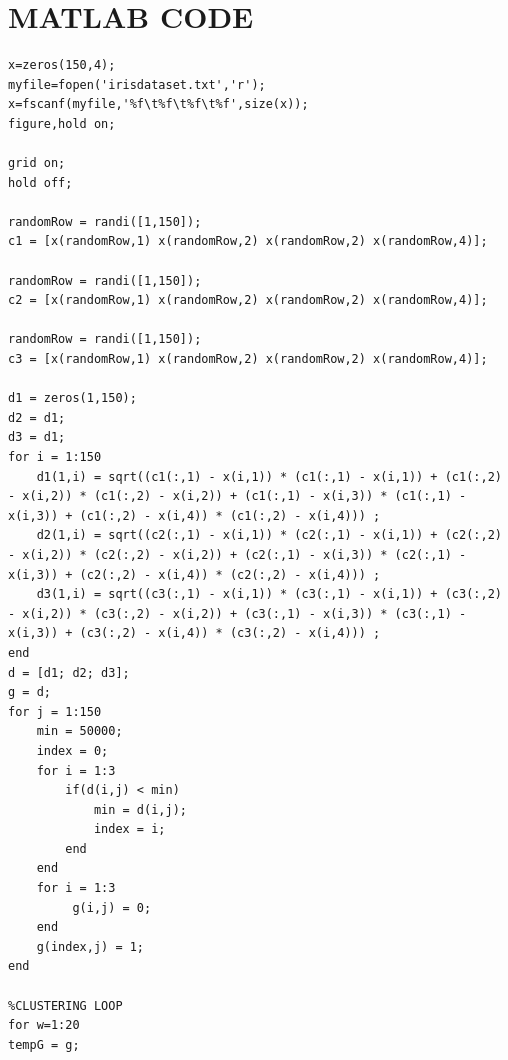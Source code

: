 \documentclass[conference]{IEEEtran}
\begin{document}
\section{MATLAB CODE}
\begin{lstlisting}
x=zeros(150,4);
myfile=fopen('irisdataset.txt','r');
x=fscanf(myfile,'%f\t%f\t%f\t%f',size(x));
figure,hold on;

grid on;
hold off;

randomRow = randi([1,150]);
c1 = [x(randomRow,1) x(randomRow,2) x(randomRow,2) x(randomRow,4)];

randomRow = randi([1,150]);
c2 = [x(randomRow,1) x(randomRow,2) x(randomRow,2) x(randomRow,4)];

randomRow = randi([1,150]);
c3 = [x(randomRow,1) x(randomRow,2) x(randomRow,2) x(randomRow,4)];

d1 = zeros(1,150);
d2 = d1;
d3 = d1;
for i = 1:150
    d1(1,i) = sqrt((c1(:,1) - x(i,1)) * (c1(:,1) - x(i,1)) + (c1(:,2) - x(i,2)) * (c1(:,2) - x(i,2)) + (c1(:,1) - x(i,3)) * (c1(:,1) - x(i,3)) + (c1(:,2) - x(i,4)) * (c1(:,2) - x(i,4))) ;
    d2(1,i) = sqrt((c2(:,1) - x(i,1)) * (c2(:,1) - x(i,1)) + (c2(:,2) - x(i,2)) * (c2(:,2) - x(i,2)) + (c2(:,1) - x(i,3)) * (c2(:,1) - x(i,3)) + (c2(:,2) - x(i,4)) * (c2(:,2) - x(i,4))) ;
    d3(1,i) = sqrt((c3(:,1) - x(i,1)) * (c3(:,1) - x(i,1)) + (c3(:,2) - x(i,2)) * (c3(:,2) - x(i,2)) + (c3(:,1) - x(i,3)) * (c3(:,1) - x(i,3)) + (c3(:,2) - x(i,4)) * (c3(:,2) - x(i,4))) ;
end
d = [d1; d2; d3];
g = d;
for j = 1:150
    min = 50000;
    index = 0;
    for i = 1:3
        if(d(i,j) < min)
            min = d(i,j);
            index = i;
        end
    end
    for i = 1:3
         g(i,j) = 0;
    end
    g(index,j) = 1;
end

%CLUSTERING LOOP
for w=1:20 
tempG = g;


\end{lstlisting}
\end{document}
